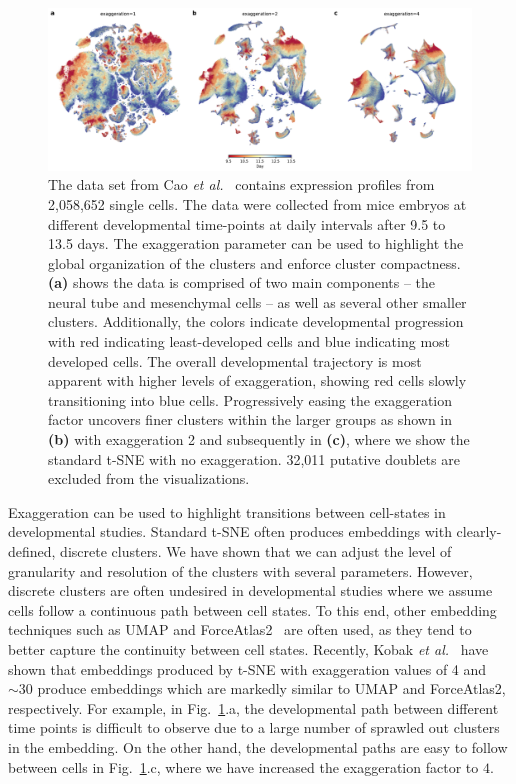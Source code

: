 \documentclass[twocolumn]{bmcart}
\begin{document}
\begin{figure}[htbp]
  \includegraphics[width=\textwidth]{cao2019}
  \caption{\label{fig:cao}The data set from Cao \textit{et
	al.}~\cite{cao2019single} contains expression profiles from 2,058,652
	single cells. The data were collected from mice embryos at different
	developmental time-points at daily intervals after 9.5 to 13.5 days.
	The exaggeration parameter can be used to highlight the global
	organization of the clusters and enforce cluster compactness.
	\textbf{(a)} shows the data is comprised of two main components -- the
	neural tube and mesenchymal cells -- as well as several other smaller
	clusters. Additionally, the colors indicate developmental progression
	with red indicating least-developed cells and blue indicating most
	developed cells. The overall developmental trajectory is most apparent
	with higher levels of exaggeration, showing red cells slowly
	transitioning into blue cells. Progressively easing the exaggeration
	factor uncovers finer clusters within the larger groups as shown in
	\textbf{(b)} with exaggeration 2 and subsequently in \textbf{(c)},
	where we show the standard t-SNE with no exaggeration. 32,011 putative
	doublets are excluded from the visualizations.}
\end{figure}

Exaggeration can be used to highlight transitions between cell-states in
developmental studies. Standard t-SNE often produces embeddings with
clearly-defined, discrete clusters. We have shown that we can adjust the level
of granularity and resolution of the clusters with several parameters. However,
discrete clusters are often undesired in developmental studies where we assume
cells follow a continuous path between cell states. To this end, other
embedding techniques such as UMAP and ForceAtlas2~\cite{jacomy2014forceatlas2}
are often used, as they tend to better capture the continuity between cell
states. Recently, Kobak \textit{et al.}~\cite{TODO} have shown that embeddings
produced by t-SNE with exaggeration values of 4 and $\sim30$ produce embeddings
which are markedly similar to UMAP and ForceAtlas2, respectively. For example,
in Fig.~\ref{fig:cao}.a, the developmental path between different time points
is difficult to observe due to a large number of sprawled out clusters in the
embedding. On the other hand, the developmental paths are easy to follow
between cells in Fig.~\ref{fig:cao}.c, where we have increased the exaggeration
factor to $4$.
\end{document}
